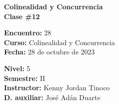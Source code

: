 \begin{center} \textbf
{
    \Large Colinealidad y Concurrencia \\ \vspace{2mm}Clase \#12
}
\end{center}

\begin{multicols}{2}
{
    \textbf{Encuentro:} 28\\
    \textbf{Curso:} Colinealidad y Concurrencia\\
    \textbf{Fecha:} 28 de octubre de 2023\\
    \begin{flushright}
        \textbf{Nivel:} 5\\
        \textbf{Semestre:} II\\
        \textbf{Instructor:} Kenny Jordan Tinoco\\
        \textbf{D. auxiliar:} José Adán Duarte
    \end{flushright}
}
\end{multicols}

\thispagestyle{first-page-style}